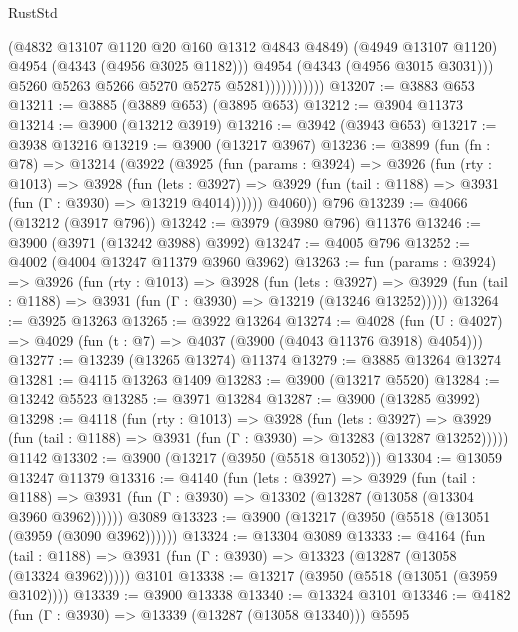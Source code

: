 \begin{lexlean}{RustStd}
\begin{coremodule}
                              (@4832 @13107 @1120 @20 @160 @1312 @4843 @4849)
                              (@4949 @13107 @1120)
                              @4954
                              (@4343 (@4956 @3025 @1182)))
                            @4954
                            (@4343 (@4956 @3015 @3031)))
                          @5260
                          @5263
                          @5266
                          @5270
                          @5275
                          @5281)))))))))))
@13207 := @3883 @653
@13211 := @3885 (@3889 @653) (@3895 @653)
@13212 := @3904 @11373
@13214 := @3900 (@13212 @3919)
@13216 := @3942 (@3943 @653)
@13217 := @3938 @13216
@13219 := @3900 (@13217 @3967)
@13236 := @3899
    (fun (fn : @78) =>
    @13214
      (@3922
        (@3925
          (fun (params : @3924) =>
          @3926
            (fun (rty : @1013) =>
            @3928
              (fun (lets : @3927) =>
              @3929 (fun (tail : @1188) => @3931 (fun (Γ : @3930) => @13219 @4014))))))
        @4060))
    @796
@13239 := @4066 (@13212 (@3917 @796))
@13242 := @3979 (@3980 @796) @11376
@13246 := @3900 (@3971 (@13242 @3988) @3992)
@13247 := @4005 @796
@13252 := @4002 (@4004 @13247 @11379 @3960 @3962)
@13263 := fun (params : @3924) =>
  @3926
    (fun (rty : @1013) =>
    @3928
      (fun (lets : @3927) =>
      @3929 (fun (tail : @1188) => @3931 (fun (Γ : @3930) => @13219 (@13246 @13252)))))
@13264 := @3925 @13263
@13265 := @3922 @13264
@13274 := @4028
    (fun (U : @4027) => @4029 (fun (t : @7) => @4037 (@3900 (@4043 @11376 @3918) @4054)))
@13277 := @13239 (@13265 @13274) @11374
@13279 := @3885 @13264 @13274
@13281 := @4115 @13263 @1409
@13283 := @3900 (@13217 @5520)
@13284 := @13242 @5523
@13285 := @3971 @13284
@13287 := @3900 (@13285 @3992)
@13298 := @4118
    (fun (rty : @1013) =>
    @3928
      (fun (lets : @3927) =>
      @3929 (fun (tail : @1188) => @3931 (fun (Γ : @3930) => @13283 (@13287 @13252)))))
    @1142
@13302 := @3900 (@13217 (@3950 (@5518 @13052)))
@13304 := @13059 @13247 @11379
@13316 := @4140
    (fun (lets : @3927) =>
    @3929
      (fun (tail : @1188) =>
      @3931 (fun (Γ : @3930) => @13302 (@13287 (@13058 (@13304 @3960 @3962))))))
    @3089
@13323 := @3900 (@13217 (@3950 (@5518 (@13051 (@3959 (@3090 @3962))))))
@13324 := @13304 @3089
@13333 := @4164
    (fun (tail : @1188) => @3931 (fun (Γ : @3930) => @13323 (@13287 (@13058 (@13324 @3962)))))
    @3101
@13338 := @13217 (@3950 (@5518 (@13051 (@3959 @3102))))
@13339 := @3900 @13338
@13340 := @13324 @3101
@13346 := @4182 (fun (Γ : @3930) => @13339 (@13287 (@13058 @13340))) @5595

\end{coremodule}
\end{lexlean}
